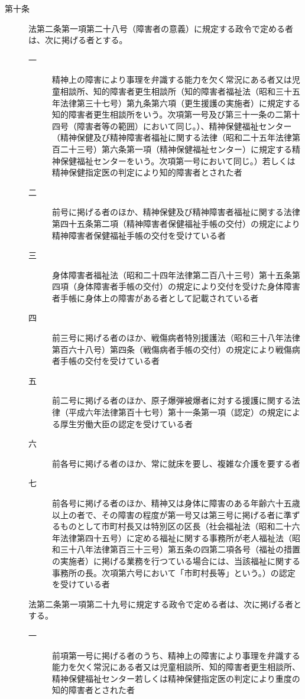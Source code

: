 \documentclass[twocolumn,a4j,10pt]{ltjtarticle}
\begin{document}
\begin{description}
\item[第十条]法第二条第一項第二十八号（障害者の意義）に規定する政令で定める者は、次に掲げる者とする。
\begin{description}
\item[一]精神上の障害により事理を弁識する能力を欠く常況にある者又は児童相談所、知的障害者更生相談所（知的障害者福祉法（昭和三十五年法律第三十七号）第九条第六項（更生援護の実施者）に規定する知的障害者更生相談所をいう。次項第一号及び第三十一条の二第十四号（障害者等の範囲）において同じ。）、精神保健福祉センター（精神保健及び精神障害者福祉に関する法律（昭和二十五年法律第百二十三号）第六条第一項（精神保健福祉センター）に規定する精神保健福祉センターをいう。次項第一号において同じ。）若しくは精神保健指定医の判定により知的障害者とされた者
\item[二]前号に掲げる者のほか、精神保健及び精神障害者福祉に関する法律第四十五条第二項（精神障害者保健福祉手帳の交付）の規定により精神障害者保健福祉手帳の交付を受けている者
\item[三]身体障害者福祉法（昭和二十四年法律第二百八十三号）第十五条第四項（身体障害者手帳の交付）の規定により交付を受けた身体障害者手帳に身体上の障害がある者として記載されている者
\item[四]前三号に掲げる者のほか、戦傷病者特別援護法（昭和三十八年法律第百六十八号）第四条（戦傷病者手帳の交付）の規定により戦傷病者手帳の交付を受けている者
\item[五]前二号に掲げる者のほか、原子爆弾被爆者に対する援護に関する法律（平成六年法律第百十七号）第十一条第一項（認定）の規定による厚生労働大臣の認定を受けている者
\item[六]前各号に掲げる者のほか、常に就床を要し、複雑な介護を要する者
\item[七]前各号に掲げる者のほか、精神又は身体に障害のある年齢六十五歳以上の者で、その障害の程度が第一号又は第三号に掲げる者に準ずるものとして市町村長又は特別区の区長（社会福祉法（昭和二十六年法律第四十五号）に定める福祉に関する事務所が老人福祉法（昭和三十八年法律第百三十三号）第五条の四第二項各号（福祉の措置の実施者）に掲げる業務を行つている場合には、当該福祉に関する事務所の長。次項第六号において「市町村長等」という。）の認定を受けている者
\end{description}
\item[]法第二条第一項第二十九号に規定する政令で定める者は、次に掲げる者とする。
\begin{description}
\item[一]前項第一号に掲げる者のうち、精神上の障害により事理を弁識する能力を欠く常況にある者又は児童相談所、知的障害者更生相談所、精神保健福祉センター若しくは精神保健指定医の判定により重度の知的障害者とされた者

\end{description}
\end{description}
\end{document}
